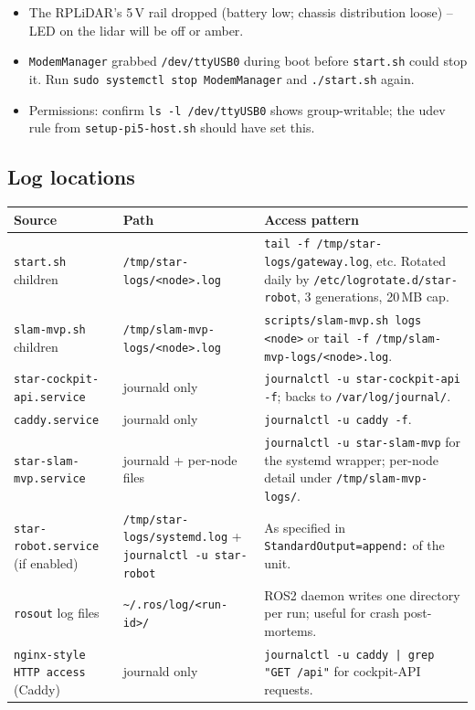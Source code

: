\begin{itemize}
  \item The RPLiDAR's 5\,V rail dropped (battery low; chassis
        distribution loose) -- LED on the lidar will be off or
        amber.
  \item \texttt{ModemManager} grabbed \texttt{/dev/ttyUSB0} during
        boot before \texttt{start.sh} could stop it. Run
        \texttt{sudo systemctl stop ModemManager} and
        \texttt{./start.sh} again.
  \item Permissions: confirm \texttt{ls -l /dev/ttyUSB0} shows
        group-writable; the udev rule from
        \texttt{setup-pi5-host.sh} should have set this.
\end{itemize}

\subsection{Log locations}

\begin{center}
\begin{tabular}{|p{4.6cm}|p{4.4cm}|p{5.7cm}|}
\hline
\textbf{Source} & \textbf{Path} & \textbf{Access pattern} \\
\hline
\texttt{start.sh} children &
\texttt{/tmp/star-logs/<node>.log} &
\texttt{tail -f /tmp/star-logs/gateway.log}, etc. Rotated daily by
\texttt{/etc/logrotate.d/star-robot}, 3 generations, 20\,MB cap. \\
\hline
\texttt{slam-mvp.sh} children &
\texttt{/tmp/slam-mvp-logs/<node>.log} &
\texttt{scripts/slam-mvp.sh logs <node>} or
\texttt{tail -f /tmp/slam-mvp-logs/<node>.log}. \\
\hline
\texttt{star-cockpit-api.service} & journald only &
\texttt{journalctl -u star-cockpit-api -f}; backs to
\texttt{/var/log/journal/}. \\
\hline
\texttt{caddy.service} & journald only &
\texttt{journalctl -u caddy -f}. \\
\hline
\texttt{star-slam-mvp.service} & journald + per-node files &
\texttt{journalctl -u star-slam-mvp} for the systemd wrapper;
per-node detail under \texttt{/tmp/slam-mvp-logs/}. \\
\hline
\texttt{star-robot.service} (if enabled) &
\texttt{/tmp/star-logs/systemd.log} +
\texttt{journalctl -u star-robot} & As specified in
\texttt{StandardOutput=append:} of the unit. \\
\hline
\texttt{rosout} log files & \texttt{\textasciitilde/.ros/log/<run-id>/} &
ROS2 daemon writes one directory per run; useful for crash
post-mortems. \\
\hline
\texttt{nginx-style HTTP access} (Caddy) & journald only &
\texttt{journalctl -u caddy | grep "GET /api"} for cockpit-API
requests. \\
\hline
\end{tabular}
\end{center}

